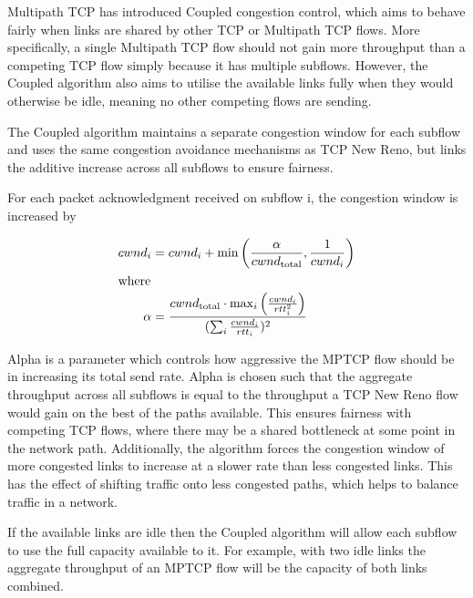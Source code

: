Multipath TCP has introduced Coupled congestion control, which aims to behave
fairly when links are shared by other TCP or Multipath TCP flows. More
specifically, a single Multipath TCP flow should not gain more throughput than a
competing TCP flow simply because it has multiple subflows. However, the Coupled
algorithm also aims to utilise the available links fully when they would
otherwise be idle, meaning no other competing flows are sending.

The Coupled algorithm maintains a separate congestion window for each subflow
and uses the same congestion avoidance mechanisms as TCP New Reno, but links the
additive increase across all subflows to ensure fairness.

For each packet acknowledgment received on subflow i, the congestion window is
increased by

\begin{align*}
  cwnd_i &= cwnd_i +
    \min\left(\frac{\alpha}{cwnd_\text{total}}, \frac{1}{cwnd_i}\right) \\
  \intertext{where}
  \alpha &=
    \frac{cwnd_\text{total} \cdot \max_i\left(\frac{cwnd_i}{rtt_i^2}\right)}
         {(\sum_i \frac{cwnd_i}{rtt_i})^2}
\end{align*}

Alpha is a parameter which controls how aggressive the MPTCP flow should be in
increasing its total send rate. Alpha is chosen such that the aggregate
throughput across all subflows is equal to the throughput a TCP New Reno flow
would gain on the best of the paths available. This ensures fairness with
competing TCP flows, where there may be a shared bottleneck at some point in the
network path. Additionally, the algorithm forces the congestion window of more
congested links to increase at a slower rate than less congested links. This has
the effect of shifting traffic  onto less congested paths, which helps to
balance traffic in a network.

If the available links are idle then the Coupled algorithm will allow each
subflow to use the full capacity available to it. For example, with two idle
links the aggregate throughput of an MPTCP flow will be the capacity of both
links combined.


